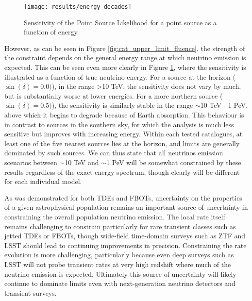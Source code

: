 \begin{figure}[!ht]
	\centering \texttt{[image: results/energy\_decades]}
	\caption{Sensitivity of the Point Source Likelihood for a point source as a function of energy.}
	\label{fig:sens_disc_energy}
\end{figure}

However, as can be seen in Figure \ref{fig:cat_upper_limit_fluence}, the strength of the constraint depends on the general energy range at which neutrino emission is expected. This can be seen even more clearly in Figure \ref{fig:sens_disc_energy}, where the sensitivity is illustrated as a function of true neutrino energy. For a source at the horizon ($\sin(\delta)=0.0)$), in the range >10 TeV, the sensitivity does not vary by much, but is substantially worse at lower energies. For a more northern source ($\sin(\delta)=0.5)$), the sensitivity is similarly stable in the range $\sim$10 TeV - 1 PeV, above which it begins to degrade because of Earth absorption. This behaviour is in contrast to sources in the southern sky, for which the analysis is much less sensitive but improves with increasing energy. Within each tested catalogues, at least one of the five nearest sources lies at the horizon, and limits are generally dominated by such sources. We can thus state that all neutrinos emission scenarios between $\sim$10 TeV  and $\sim$1 PeV will be somewhat constrained by these results regardless of the exact energy spectrum, though clearly will be different for each individual model.

As was demonstrated for both TDEs and FBOTs, uncertainty on the properties of a given astrophysical population remains an important source of uncertainty in constraining the overall population neutrino emission. The local rate itself remains challenging to constrain particularly for rare transient classes such as jetted TDEs or FBOTs, though wide-field time-domain surveys such as ZTF and LSST should lead to continuing improvements in precision. Constraining the rate evolution is more challenging, particularly because even deep surveys such as LSST will not probe transient rates at very high redshift where much of the neutrino emission is expected. Ultimately this source of uncertainty will likely continue to dominate limits even with next-generation neutrino detectors and transient surveys.